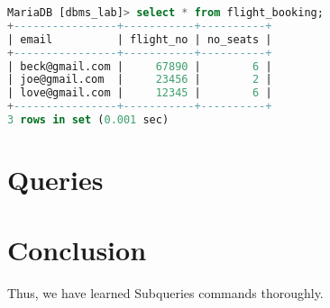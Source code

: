 \documentclass[11pt]{article}
\begin{document}
\begin{lstlisting}[language=sql]
MariaDB [dbms_lab]> select * from flight_booking;
+----------------+-----------+----------+
| email          | flight_no | no_seats |
+----------------+-----------+----------+
| beck@gmail.com |     67890 |        6 |
| joe@gmail.com  |     23456 |        2 |
| love@gmail.com |     12345 |        6 |
+----------------+-----------+----------+
3 rows in set (0.001 sec)

\end{lstlisting}

\section{Queries}



\section{Conclusion}
Thus, we have learned Subqueries commands thoroughly.

\clearpage
\end{document}
